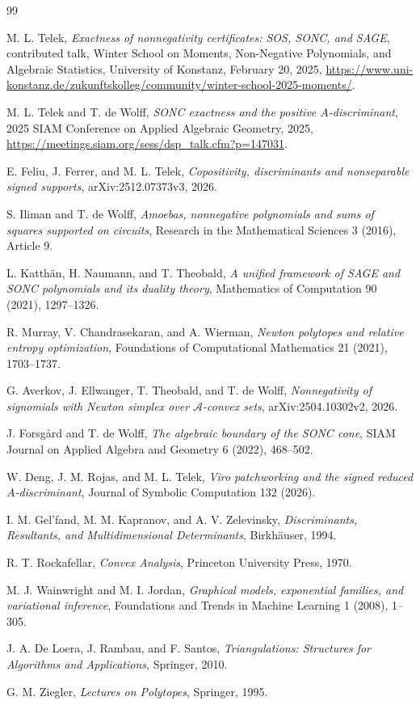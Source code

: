 \documentclass[11pt]{article}
\theoremstyle{plain}
\theoremstyle{definition}
\theoremstyle{remark}
\begin{document}
\begin{thebibliography}{99}

M. L. Telek,
\emph{Exactness of nonnegativity certificates: SOS, SONC, and SAGE},
contributed talk, Winter School on Moments, Non-Negative Polynomials, and Algebraic Statistics,
University of Konstanz, February 20, 2025,
\url{https://www.uni-konstanz.de/zukunftskolleg/community/winter-school-2025-moments/}.

M. L. Telek and T. de Wolff,
\emph{SONC exactness and the positive $A$-discriminant},
2025 SIAM Conference on Applied Algebraic Geometry, 2025,
\url{https://meetings.siam.org/sess/dsp_talk.cfm?p=147031}.

E. Feliu, J. Ferrer, and M. L. Telek,
\emph{Copositivity, discriminants and nonseparable signed supports},
arXiv:2512.07373v3, 2026.

S. Iliman and T. de Wolff,
\emph{Amoebas, nonnegative polynomials and sums of squares supported on circuits},
Research in the Mathematical Sciences 3 (2016), Article 9.

L. Katth\"an, H. Naumann, and T. Theobald,
\emph{A unified framework of SAGE and SONC polynomials and its duality theory},
Mathematics of Computation 90 (2021), 1297--1326.

R. Murray, V. Chandrasekaran, and A. Wierman,
\emph{Newton polytopes and relative entropy optimization},
Foundations of Computational Mathematics 21 (2021), 1703--1737.

G. Averkov, J. Ellwanger, T. Theobald, and T. de Wolff,
\emph{Nonnegativity of signomials with Newton simplex over $\mathcal A$-convex sets},
arXiv:2504.10302v2, 2026.

J. Forsg\r ard and T. de Wolff,
\emph{The algebraic boundary of the SONC cone},
SIAM Journal on Applied Algebra and Geometry 6 (2022), 468--502.

W. Deng, J. M. Rojas, and M. L. Telek,
\emph{Viro patchworking and the signed reduced $A$-discriminant},
Journal of Symbolic Computation 132 (2026).

I. M. Gel'fand, M. M. Kapranov, and A. V. Zelevinsky,
\emph{Discriminants, Resultants, and Multidimensional Determinants},
Birkh\"auser, 1994.

R. T. Rockafellar,
\emph{Convex Analysis},
Princeton University Press, 1970.

M. J. Wainwright and M. I. Jordan,
\emph{Graphical models, exponential families, and variational inference},
Foundations and Trends in Machine Learning 1 (2008), 1--305.

J. A. De Loera, J. Rambau, and F. Santos,
\emph{Triangulations: Structures for Algorithms and Applications},
Springer, 2010.

G. M. Ziegler,
\emph{Lectures on Polytopes},
Springer, 1995.

\end{thebibliography}
\end{document}
